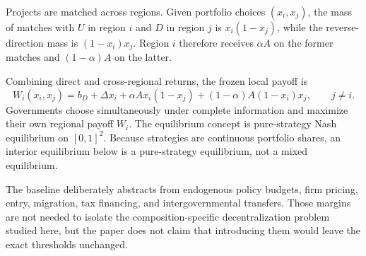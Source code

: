 Projects are matched across regions. Given portfolio choices $(x_i,x_j)$, the mass of matches with $U$ in region $i$ and $D$ in region $j$ is $x_i(1-x_j)$, while the reverse-direction mass is $(1-x_i)x_j$. Region $i$ therefore receives $\alpha A$ on the former matches and $(1-\alpha)A$ on the latter.

Combining direct and cross-regional returns, the frozen local payoff is
\begin{equation}
W_i(x_i,x_j)
=b_D+\Delta x_i
+\alpha A x_i(1-x_j)
+(1-\alpha)A(1-x_i)x_j,
\qquad j\neq i.
\label{eq:local-payoff}
\end{equation}
Governments choose simultaneously under complete information and maximize their own regional payoff $W_i$. The equilibrium concept is pure-strategy Nash equilibrium on $[0,1]^2$. Because strategies are continuous portfolio shares, an interior equilibrium below is a pure-strategy equilibrium, not a mixed equilibrium.

The baseline deliberately abstracts from endogenous policy budgets, firm pricing, entry, migration, tax financing, and intergovernmental transfers. Those margins are not needed to isolate the composition-specific decentralization problem studied here, but the paper does not claim that introducing them would leave the exact thresholds unchanged.

